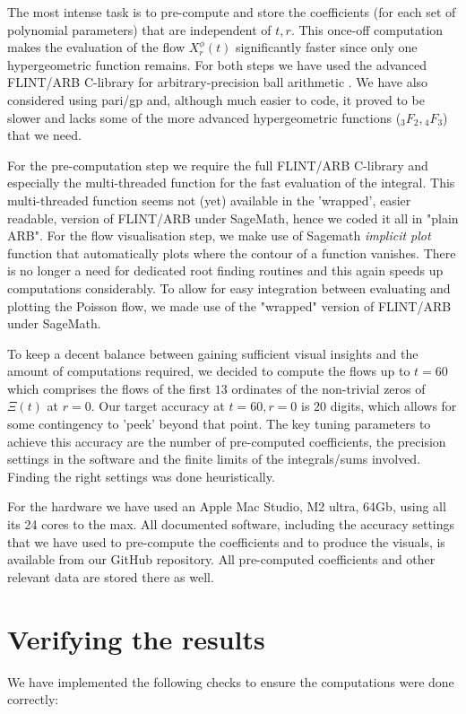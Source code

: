 \documentclass[a4paper,11pt,twoside]{amsart}
\begin{document}
The most intense task is to pre-compute and store the coefficients (for each set of polynomial parameters) that are independent of $t, r$. This once-off computation makes the evaluation of the flow $X^\phi_r(t)$ significantly faster since only one hypergeometric function remains. For both steps we have used the advanced FLINT/ARB C-library for arbitrary-precision ball arithmetic \cite{arb}. We have also considered using pari/gp and, although much easier to code, it proved to be slower and lacks some of the more advanced hypergeometric functions (${}_3F_2,{}_4F_3$) that we need.

For the pre-computation step we require the full FLINT/ARB C-library and especially the multi-threaded function for the fast evaluation of the integral. This multi-threaded function seems not (yet) available in the 'wrapped', easier readable, version of FLINT/ARB under SageMath, hence we coded it all in "plain ARB". For the flow visualisation step, we make use of Sagemath \textit{implicit plot} function that automatically plots where the contour of a function vanishes. There is no longer a need for dedicated root finding routines and this again speeds up computations considerably. To allow for easy integration between evaluating and plotting the Poisson flow, we made use of the "wrapped" version of FLINT/ARB under SageMath.    

To keep a decent balance between gaining sufficient visual insights and the amount of computations required, we decided to compute the flows up to $t=60$ which comprises the flows of the first $13$ ordinates of the non-trivial zeros of $\Xi(t)$ at $r=0$. Our target accuracy at $t=60, r=0$ is $20$ digits, which allows for some contingency to 'peek' beyond that point. The key tuning parameters to achieve this accuracy are the number of pre-computed coefficients, the precision settings in the software and the finite limits of the integrals/sums involved. Finding the right settings was done heuristically. 

For the hardware we have used an Apple Mac Studio, M2 ultra, 64Gb, using all its 24 cores to the max. All documented software, including the accuracy settings that we have used to pre-compute the coefficients and to produce the visuals, is available from our GitHub \cite{git} repository. All pre-computed coefficients and other relevant data are stored there as well.

\section{Verifying the results}\label{checks}
We have implemented the following checks to ensure the computations were done correctly:
\end{document}
